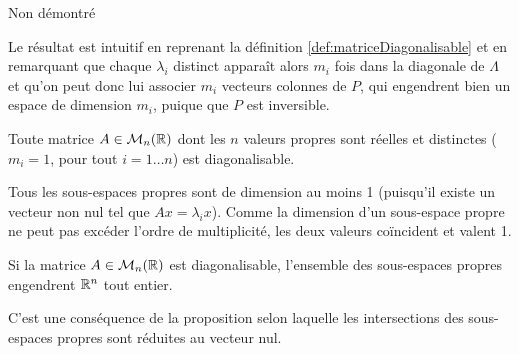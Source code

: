 \proof
Non démontré
\eproof

\remark
Le résultat est intuitif en reprenant la définition \ref{def:matriceDiagonalisable} et en remarquant que chaque $\lambda_i$ distinct apparaît alors $m_i$ fois dans la diagonale de $\Lambda$ et qu'on peut donc lui associer $m_i$ vecteurs colonnes de $P$, qui engendrent bien un espace de dimension $m_i$, puique que $P$ est inversible.

\begin{corollary*}
  Toute matrice $A \in \mathcal{M}_n(\mathbb{R})$ dont les $n$ valeurs propres sont réelles et distinctes ($m_i = 1$, pour tout $i = 1 \dots n$) est diagonalisable.
\end{corollary*}

\proof
Tous les sous-espaces propres sont de dimension au moins 1 (puisqu'il existe un vecteur non nul tel que $Ax = \lambda_i x$). Comme la dimension d'un sous-espace propre ne peut pas excéder l'ordre de multiplicité, les deux valeurs coïncident et valent 1.
\eproof

\begin{corollary*}
  Si la matrice $A \in \mathcal{M}_n(\mathbb{R})$ est diagonalisable, l'ensemble des sous-espaces propres engendrent $\mathbb{R}^n$ tout entier.
\end{corollary*}

\proof
C'est une conséquence de la proposition selon laquelle les intersections des sous-espaces propres sont réduites au vecteur nul.
\eproof


